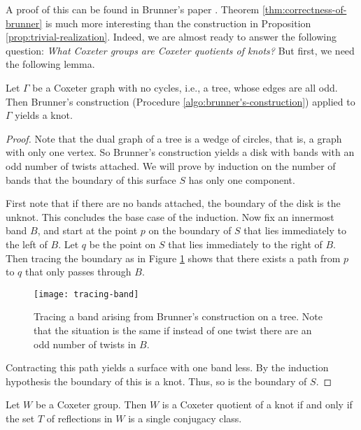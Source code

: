 \documentclass[main.tex]{subfiles}
\begin{document}
A proof of this can be found in Brunner's paper \cite{brunner1992}.
Theorem \ref{thm:correctness-of-brunner} is much more interesting than the construction in Proposition \ref{prop:trivial-realization}. Indeed, we are almost ready to answer the following question: \textit{What Coxeter groups are Coxeter quotients of knots?} But first, we need the following lemma.

\begin{lemma}\label{lem:tree->knot}
Let $\Gamma$ be a Coxeter graph with no cycles, i.e., a tree, whose edges are all odd. Then Brunner's construction \textup{(Procedure \ref{algo:brunner's-construction})} applied to $\Gamma$ yields a knot.
\end{lemma}

\begin{proof}
Note that the dual graph of a tree is a wedge of circles, that is, a graph with only one vertex. So Brunner's construction yields a disk with bands with an odd number of twists attached. We will prove by induction on the number of bands that the boundary of this surface $S$ has only one component.

First note that if there are no bands attached, the boundary of the disk is the unknot. This concludes the base case of the induction. Now  fix an innermost band $B$, and start at the point $p$ on the boundary of $S$ that lies immediately to the left of $B$. Let $q$ be the point on $S$ that lies immediately to the right of $B$. Then tracing the boundary as in Figure \ref{fig:tracing-band} shows that there exists a path from $p$ to $q$ that only passes through $B$.

\begin{figure}[htb]
\centering
\texttt{[image: tracing-band]}
\caption{Tracing a band arising from Brunner's construction on a tree. Note that the situation is the same if instead of one twist there are an odd number of twists in $B$.}
\label{fig:tracing-band}
\end{figure}

Contracting this path yields a surface with one band less. By the induction hypothesis the boundary of this is a knot. Thus, so is the boundary of $S$.
\end{proof}

\begin{theorem}
Let $W$ be a Coxeter group. Then $W$ is a Coxeter quotient of a knot if and only if the set $T$ of reflections in $W$ is a single conjugacy class.
\end{theorem}
\end{document}

